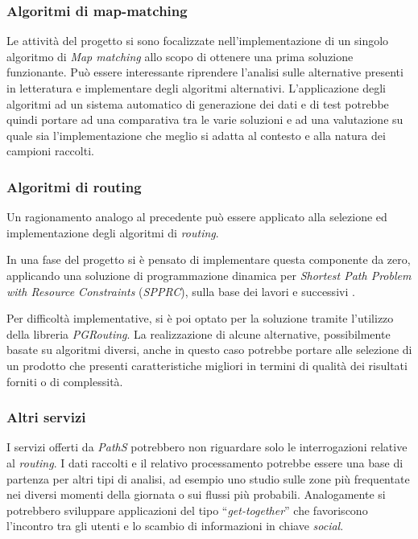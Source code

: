 \subsubsection{Algoritmi di map-matching}
Le attività del progetto si sono focalizzate nell'implementazione di un singolo algoritmo di \emph{Map matching} allo scopo di ottenere una prima soluzione funzionante. Può essere interessante riprendere l'analisi sulle alternative presenti in letteratura e implementare degli algoritmi alternativi. L'applicazione degli algoritmi ad un sistema automatico di generazione dei dati e di test potrebbe quindi portare ad una comparativa tra le varie soluzioni e ad una valutazione su quale sia l'implementazione che meglio si adatta al contesto e alla natura dei campioni raccolti.

\subsubsection{Algoritmi di routing}
Un ragionamento analogo al precedente può essere applicato alla selezione ed implementazione degli algoritmi di \emph{routing}. 

In una fase del progetto si è pensato di implementare questa componente da zero, applicando una soluzione di programmazione dinamica per \emph{Shortest Path Problem with Resource Constraints} (\emph{SPPRC}), sulla base dei lavori \cite[Desrochers~e~Soumis]{labelling} e successivi \cite[capitolo~4.4]{spprc}. 

Per difficoltà implementative, si è poi optato per la soluzione tramite l'utilizzo della libreria \emph{PGRouting}. La realizzazione di alcune alternative, possibilmente basate su algoritmi diversi, anche in questo caso potrebbe portare alle selezione di un prodotto che presenti caratteristiche migliori in termini di qualità dei risultati forniti o di complessità.

\subsubsection{Altri servizi}
I servizi offerti da \emph{PathS} potrebbero non riguardare solo le interrogazioni relative al \emph{routing}. I dati raccolti e il relativo processamento potrebbe essere una base di partenza per altri tipi di analisi, ad esempio uno studio sulle zone più frequentate nei diversi momenti della giornata o sui flussi più probabili. Analogamente si potrebbero sviluppare applicazioni del tipo ``\emph{get-together}'' che favoriscono l'incontro tra gli utenti e lo scambio di informazioni in chiave \emph{social}.
